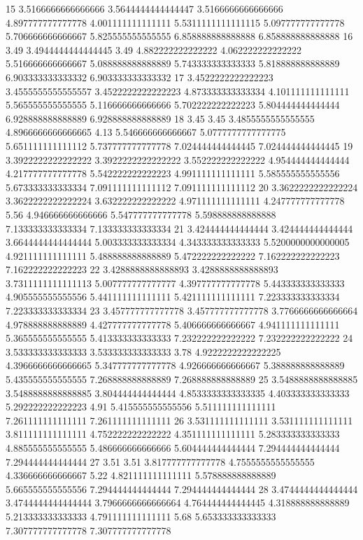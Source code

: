 15 3.5166666666666666 3.5644444444444447 3.5166666666666666 4.897777777777778 4.001111111111111 5.5311111111111115 5.097777777777778 5.706666666666667 5.825555555555555 6.858888888888888 6.858888888888888
16 3.49 3.4944444444444445 3.49 4.882222222222222 4.062222222222222 5.516666666666667 5.088888888888889 5.743333333333333 5.818888888888889 6.903333333333332 6.903333333333332
17 3.4522222222222223 3.4555555555555557 3.4522222222222223 4.873333333333334 4.101111111111111 5.565555555555555 5.116666666666666 5.702222222222223 5.804444444444444 6.928888888888889 6.928888888888889
18 3.45 3.45 3.4855555555555555 4.8966666666666665 4.13 5.546666666666667 5.0777777777777775 5.651111111111112 5.737777777777778 7.024444444444445 7.024444444444445
19 3.3922222222222222 3.3922222222222222 3.552222222222222 4.954444444444444 4.217777777777778 5.542222222222223 4.991111111111111 5.585555555555556 5.673333333333334 7.091111111111112 7.091111111111112
20 3.3622222222222224 3.3622222222222224 3.632222222222222 4.971111111111111 4.247777777777778 5.56 4.946666666666666 5.547777777777778 5.598888888888888 7.133333333333334 7.133333333333334
21 3.424444444444444 3.424444444444444 3.6644444444444444 5.003333333333334 4.343333333333333 5.5200000000000005 4.921111111111111 5.488888888888889 5.472222222222222 7.162222222222223 7.162222222222223
22 3.4288888888888893 3.4288888888888893 3.7311111111111113 5.007777777777777 4.397777777777778 5.443333333333333 4.905555555555556 5.441111111111111 5.421111111111111 7.223333333333334 7.223333333333334
23 3.457777777777778 3.457777777777778 3.7766666666666664 4.978888888888889 4.427777777777778 5.406666666666667 4.941111111111111 5.365555555555555 5.413333333333333 7.232222222222222 7.232222222222222
24 3.533333333333333 3.533333333333333 3.78 4.9222222222222225 4.3966666666666665 5.347777777777778 4.926666666666667 5.388888888888889 5.435555555555555 7.268888888888889 7.268888888888889
25 3.5488888888888885 3.5488888888888885 3.804444444444444 4.8533333333333335 4.403333333333333 5.292222222222223 4.91 5.415555555555556 5.511111111111111 7.261111111111111 7.261111111111111
26 3.531111111111111 3.531111111111111 3.811111111111111 4.752222222222222 4.351111111111111 5.283333333333333 4.885555555555555 5.486666666666666 5.604444444444444 7.294444444444444 7.294444444444444
27 3.51 3.51 3.817777777777778 4.7555555555555555 4.336666666666667 5.22 4.821111111111111 5.578888888888889 5.665555555555556 7.294444444444444 7.294444444444444
28 3.4744444444444444 3.4744444444444444 3.7966666666666664 4.764444444444445 4.318888888888889 5.213333333333333 4.791111111111111 5.68 5.653333333333333 7.307777777777778 7.307777777777778
